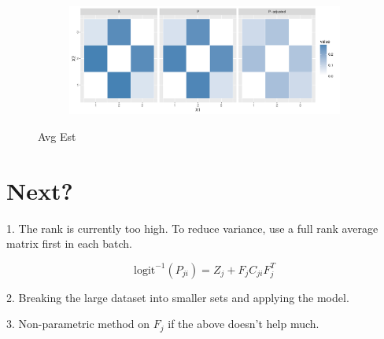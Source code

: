 \documentclass[12pt]{article}
\newcommand{\bfi}{\begin{figure}[H]}
\newcommand{\efi}{\end{figure}}
\newcommand{\bsfi}{\begin{subfigure}[t]}
\newcommand{\esfi}{\end{subfigure}}
\begin{document}
\bfi
\centering
\bsfi{1\columnwidth}
\includegraphics[width=1\columnwidth]{../BatchEffectRemoval/distance_between_dataset}
\esfi
\caption{Avg Est}
\efi

\section{Next?}

1. The rank is currently too high. To reduce variance, use a full rank average matrix first in each batch.

$$ \text{logit}^{-1}(P_{ji})  = Z_j + F_j C_{ji} F_j^T$$

2. Breaking the large dataset into smaller sets and applying the model.

3. Non-parametric method on $F_j$ if the above doesn't help much.
\end{document}
